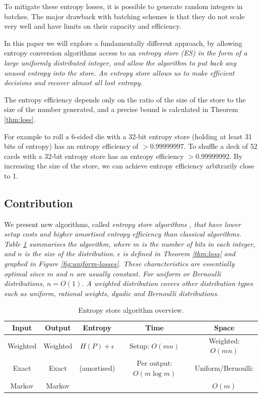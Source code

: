 \documentclass[12pt]{article}
\begin{document}
To mitigate these entropy losses, it is possible to generate random integers in batches. The major drawback with batching schemes is that they do not scale very well and have limits on their capacity and efficiency.

In this paper we will explore a fundamentally different approach, by allowing entropy conversion algorithms access to an \em entropy store \em (ES) in the form of a large uniformly distributed integer, and allow the algorithm to put back any unused entropy into the store. An entropy store allows us to make efficient decisions and recover almost all lost entropy.

The entropy efficiency depends only on the ratio of the size of the store to the size of the number generated, and a precise bound is calculated in Theorem \ref{thm:loss}. 

For example to roll a 6-sided die with a 32-bit entropy store (holding at least 31 bits of entropy) has an entropy efficiency of $>0.99999997$. To shuffle a deck of 52 cards with a 32-bit entropy store has an entropy efficiency $>0.99999992$. By increasing the size of the store, we can achieve entropy efficiency arbitrarily close to 1.


\subsection {Contribution}

We present new algorithms, called \em entropy store algorithms \em, that have lower setup costs and higher amortised entropy efficiency than classical algorithms. Table \ref{tab:entropy-store} summarises the algorithm, where $m$ is the number of bits in each integer, and $n$ is the size of the distribution. $\epsilon$ is defined in Theorem \ref{thm:loss} and graphed in Figure \ref{fig:uniform-losses}. These characteristics are essentially optimal since $m$ and $n$ are usually constant.  For uniform or Bernoulli distributions, $n=O(1)$. A weighted distribution covers other distribution types such as uniform, rational weights, dyadic and Bernoulli distributions.

\begin{table}[h!]
\centering
\begin{tabular}{|c|c|c|c|c|}
\hline
Input & Output & Entropy & Time & Space \\
\hline
Weighted & Weighted & $H(P)+\epsilon$ & Setup: $O(mn)$ & Weighted: $O(mn)$ \\
Exact & Exact & (amortised) & Per output: $O(m \log m)$  &  Uniform/Bernoulli: \\
Markov & Markov &  &   & $O(m)$  \\
\hline
\end{tabular}
\caption{Entropy store algorithm overview.}
    \label{tab:entropy-store}
\end{table}
\end{document}
